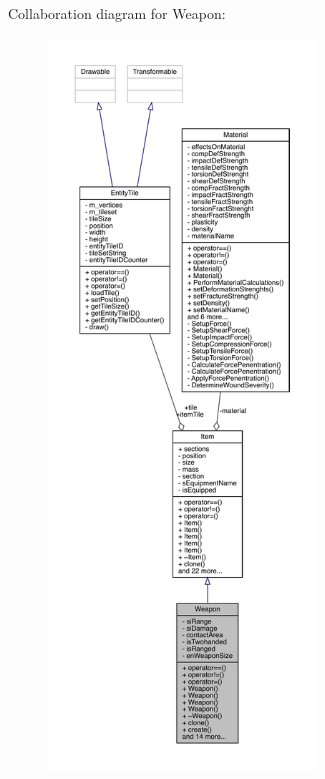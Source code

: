 Collaboration diagram for Weapon\+:
\nopagebreak
\begin{figure}[H]
\begin{center}
\leavevmode
\includegraphics[height=550pt]{class_weapon__coll__graph}
\end{center}
\end{figure}

